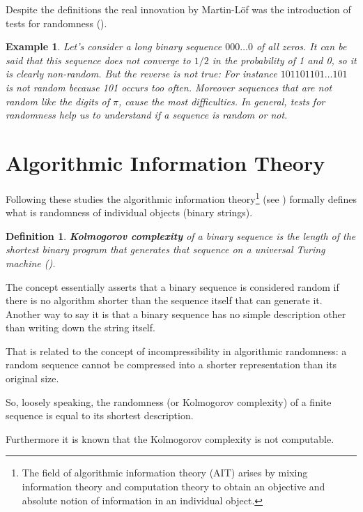 \documentclass[12pt, a4paper]{report}
\newtheorem{definition}{Definition}[section] %
\newtheorem{example}{Example} %
\begin{document}
Despite the definitions the real innovation by Martin-Löf was the introduction of tests for randomness
(\cite{TheDefinitionOfRandomSequences}).

\begin{example}
Let's consider a long binary sequence \(000\dots0\) of all zeros.
It can be said that this sequence does not converge to \(1/2\) in the probability of 1 and 0, so it is clearly non-random.
But the reverse is not true: For instance \(101101101\dots101\) is not random because 101 occurs too often.
Moreover sequences that are not random like the digits of \(\pi\), cause the most difficulties.
In general, tests for randomness help us to understand if a sequence is random or not.
\end{example}

\section{Algorithmic Information Theory}

Following these studies the algorithmic information theory\footnote{The field of algorithmic information theory (AIT) arises by
mixing information theory and computation theory to obtain an objective and absolute notion of information in an individual
object.} (see \cite{AlgorithmicInformationTheoryBriefGuide}) formally defines what is randomness of individual objects
(binary strings).

\begin{definition}
\textbf{Kolmogorov complexity} of a binary sequence is the length of the shortest binary program that generates that sequence on a
universal Turing machine (\cite{ThreeApproachesToTheQuantitativeDefinitionOfInformation}).
\end{definition}

The concept essentially asserts that a binary sequence is considered random if there is no algorithm shorter than the sequence
itself that can generate it.
Another way to say it is that a binary sequence has no simple description other than writing down the string itself.

That is related to the concept of incompressibility in algorithmic randomness: a random sequence cannot be compressed into a
shorter representation than its original size.

So, loosely speaking, the randomness (or Kolmogorov complexity) of a finite sequence is equal to its shortest description.

Furthermore it is known that the Kolmogorov complexity is not computable.
\end{document}
